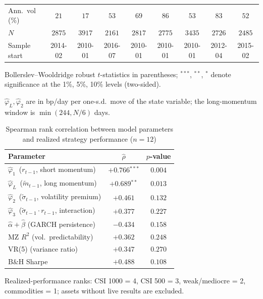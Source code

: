 \begin{table}[htbp]
\begin{threeparttable}
\begin{tabular}{lcccccccc}
Ann.\ vol (\%) & $21$ & $17$ & $53$ & $69$ & $86$ & $53$ & $83$ & $52$ \\
$N$ & $2875$ & $3917$ & $2161$ & $2817$ & $2775$ & $3435$ & $2726$ & $2485$ \\
Sample start & \scriptsize 2014-02 & \scriptsize 2010-01 & \scriptsize 2016-07 & \scriptsize 2010-01 & \scriptsize 2010-01 & \scriptsize 2010-01 & \scriptsize 2012-04 & \scriptsize 2015-02 \\
\bottomrule
\end{tabular}
\begin{tablenotes}\scriptsize
\item Bollerslev--Wooldridge robust $t$-statistics in parentheses; $^{***}$, $^{**}$, $^{*}$ denote significance at the 1\%, 5\%, 10\% levels (two-sided).
\item $\hat\varphi_L,\hat\varphi_2$ are in bp/day per one-s.d.\ move of the state variable; the long-momentum window is $\min(244,N/6)$ days.
\end{tablenotes}\end{threeparttable}\end{table}

\begin{table}[htbp]\centering
\caption{Spearman rank correlation between model parameters and realized strategy performance ($n=12$)}\label{tab:rank_en}
\small\begin{threeparttable}\begin{tabular}{lcc}\toprule
Parameter & $\hat\rho$ & $p$-value \\ \midrule
$\hat\varphi_1$~($r_{t-1}$, short momentum) & $+0.766$$^{***}$ & $0.004$ \\
$\hat\varphi_L$~($\tilde m_{t-1}$, long momentum) & $+0.689$$^{**}$ & $0.013$ \\
$\hat\varphi_2$~($\tilde\sigma_{t-1}$, volatility premium) & $+0.461$ & $0.132$ \\
$\hat\varphi_3$~($\tilde\sigma_{t-1}\!\cdot\! r_{t-1}$, interaction) & $+0.377$ & $0.227$ \\
$\hat\alpha+\hat\beta$ (GARCH persistence) & $-0.434$ & $0.158$ \\
MZ $R^2$ (vol.\ predictability) & $+0.362$ & $0.248$ \\
VR(5) (variance ratio) & $+0.347$ & $0.270$ \\
B\&H Sharpe & $+0.488$ & $0.108$ \\
\bottomrule\end{tabular}
\begin{tablenotes}\scriptsize\item Realized-performance ranks: CSI 1000 = 4, CSI 500 = 3, weak/mediocre = 2, commodities = 1; assets without live results are excluded.
\end{tablenotes}\end{threeparttable}\end{table}
